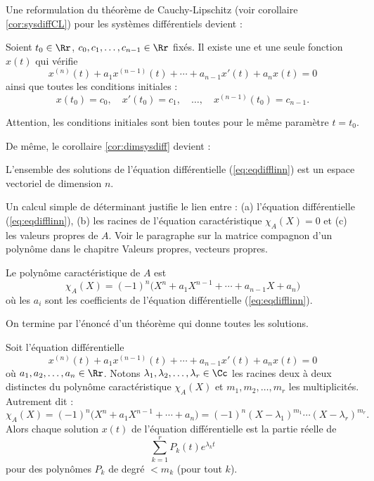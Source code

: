 \documentclass[12pt, class=report,crop=false]{standalone}
\begin{document}
Une reformulation du théorème de Cauchy-Lipschitz (voir corollaire \ref{cor:sysdiffCL}) 
pour les systèmes différentiels devient :
\begin{corollaire}
Soient $t_0\in \Rr$, $c_0,c_1,\ldots,c_{n-1} \in \Rr$ fixés.
Il existe une et une seule fonction $x(t)$ qui vérifie
$$x^{(n)}(t) + a_1x^{(n-1)}(t) + \cdots+ a_{n-1}x'(t) + a_n x(t)=0$$
ainsi que toutes les conditions initiales :
$$x(t_0) = c_0, \quad x'(t_0) = c_1, \quad \ldots, \quad x^{(n-1)}(t_0) = c_{n-1}.$$
\end{corollaire}
Attention, les conditions initiales sont bien toutes pour le même paramètre $t=t_0$.



De même, le corollaire \ref{cor:dimsysdiff} devient :
\begin{corollaire}
\label{cor:dimeqdiffn}
L'ensemble des solutions de l'équation différentielle (\ref{eq:eqdifflinn}) est
un espace vectoriel de dimension $n$.
\end{corollaire}




Un calcul simple de déterminant justifie le lien entre :
(a) l'équation différentielle (\ref{eq:eqdifflinn}),
(b) les racines de l'équation caractéristique $\chi_A(X)=0$ et
(c) les valeurs propres de $A$.
Voir le paragraphe sur la matrice compagnon d'un polynôme dans le chapitre \og{}Valeurs propres, vecteurs propres\fg{}.

\begin{lemme}
Le polynôme caractéristique de $A$ est
$$\chi_A(X) = (-1)^n \big(X^n + a_1X^{n-1} + \cdots+ a_{n-1}X + a_n\big) $$
où les $a_i$ sont les coefficients de l'équation différentielle (\ref{eq:eqdifflinn}).
\end{lemme}


On termine par l'énoncé d'un théorème qui donne toutes les solutions. 
\begin{theoreme}
Soit l'équation différentielle 
$$x^{(n)}(t) + a_1x^{(n-1)}(t) + \cdots+ a_{n-1}x'(t) + a_n x(t)=0$$
où $a_1,a_2,\ldots,a_n \in \Rr$.
Notons $\lambda_1, \lambda_2,\ldots,\lambda_r \in \Cc$ les racines deux à deux distinctes du polynôme caractéristique
$\chi_A(X)$ et $m_1,m_2,\ldots,m_r$ les multiplicités. Autrement dit :
\[\chi_A(X) = (-1)^n \big(X^n+a_1X^{n-1}+ \cdots +a_n\big) = (-1)^n(X-\lambda_1)^{m_1}\cdots(X-\lambda_r)^{m_r}.\]
Alors chaque solution $x(t)$ de l'équation différentielle est la partie réelle de 
\[\sum_{k=1}^r P_k(t)e^{\lambda_kt}\]
pour des polynômes $P_k$ de degré $< m_k$ (pour tout $k$).
\end{theoreme} 
\end{document}
